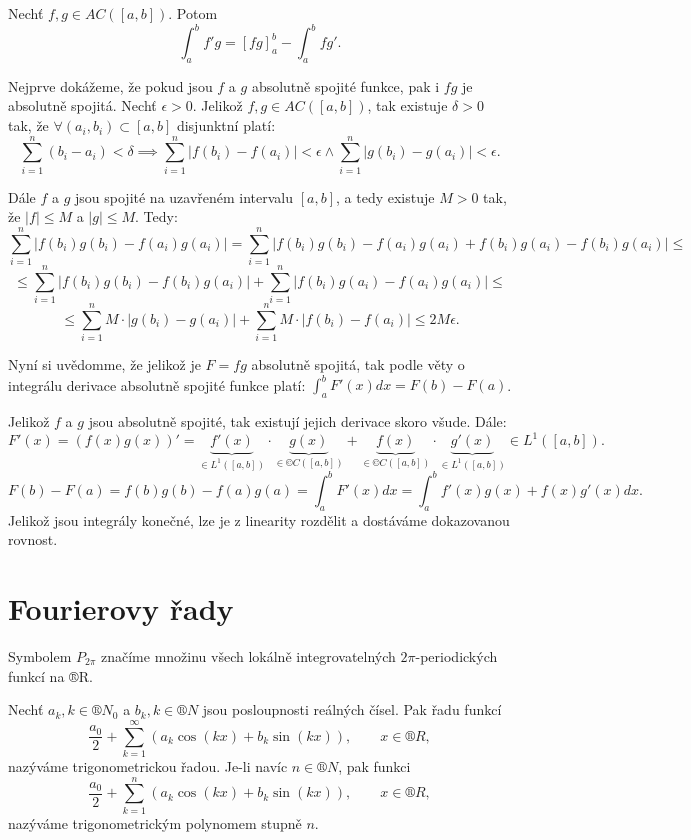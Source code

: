 \documentclass[12pt]{article}					%
\begin{document}
	\begin{veta}
		Nechť $f, g \in AC([a, b])$. Potom
		$$ \int_a^b f' g = [f g]_a^b - \int_a^b f g'. $$

		\begin{dukazin} %
			Nejprve dokážeme, že pokud jsou $f$ a $g$ absolutně spojité funkce, pak i $f g$ je absolutně spojitá. Nechť $\epsilon > 0$. Jelikož $f, g \in AC([a, b])$, tak existuje $\delta > 0$ tak, že $\forall (a_i, b_i) \subset [a, b]$ disjunktní platí:
			$$ \sum_{i=1}^n (b_i - a_i) < \delta \implies \sum_{i=1}^n |f(b_i) - f(a_i)| < \epsilon \land \sum_{i=1}^n |g(b_i) - g(a_i)| < \epsilon. $$

			Dále $f$ a $g$ jsou spojité na uzavřeném intervalu $[a, b]$, a tedy existuje $M > 0$ tak, že $|f| ≤ M$ a $|g| ≤ M$. Tedy:
			$$ \sum_{i=1}^n |f(b_i)g(b_i) - f(a_i)g(a_i)| = \sum_{i=1}^n |f(b_i)g(b_i) - f(a_i)g(a_i) + f(b_i)g(a_i) - f(b_i)g(a_i)| ≤ $$
			$$ ≤ \sum_{i=1}^n |f(b_i)g(b_i) - f(b_i)g(a_i)| + \sum_{i=1}^n |f(b_i)g(a_i) - f(a_i)g(a_i)| ≤ $$
			$$ ≤ \sum_{i=1}^n M·|g(b_i) - g(a_i)| + \sum_{i=1}^n M·|f(b_i) - f(a_i)| ≤ 2M\epsilon. $$

			Nyní si uvědomme, že jelikož je $F = f g$ absolutně spojitá, tak podle věty o integrálu derivace absolutně spojité funkce platí: $\int_a^b F'(x) dx = F(b) - F(a)$.

			Jelikož $f$ a $g$ jsou absolutně spojité, tak existují jejich derivace skoro všude. Dále:
			$$ F'(x) = (f(x)g(x))' = \underbrace{f'(x)}_{\in L^1([a, b])} · \underbrace{g(x)}_{\in ©C([a, b])} + \underbrace{f(x)}_{\in ©C([a, b])} · \underbrace{g'(x)}_{\in L^1([a, b])} \in L^1([a, b]). $$
			$$ F(b) - F(a) = f(b)g(b) - f(a)g(a) = \int_a^bF'(x) dx = \int_a^b f'(x)g(x) + f(x)g'(x) dx. $$
			Jelikož jsou integrály konečné, lze je z linearity rozdělit a dostáváme dokazovanou rovnost.
		\end{dukazin}
	\end{veta}

\section{Fourierovy řady}
	\begin{definice}
		Symbolem $P_{2\pi}$ značíme množinu všech lokálně integrovatelných $2\pi$-periodických funkcí na ®R.
	\end{definice}

	\begin{definice}
		Nechť $a_k, k \in ®N_0$ a $b_k, k \in ®N$ jsou posloupnosti reálných čísel. Pak řadu funkcí
		$$ \frac{a_0}{2} + \sum_{k=1}^∞ (a_k \cos(k x) + b_k \sin(k x)), \qquad x \in ®R, $$
		nazýváme trigonometrickou řadou. Je-li navíc $n \in ®N$, pak funkci
		$$ \frac{a_0}{2} + \sum_{k=1}^n (a_k \cos(k x) + b_k \sin(k x)), \qquad x \in ®R, $$
		nazýváme trigonometrickým polynomem stupně $n$.
	\end{definice}
\end{document}
